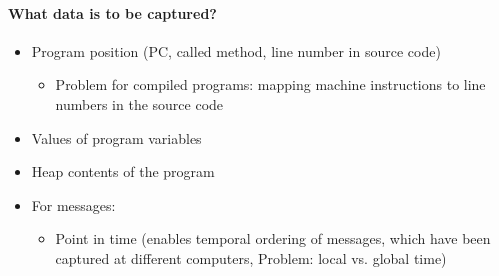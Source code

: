 \documentclass[10pt,a4paper]{article}
\begin{document}
		\paragraph{What data is to be captured?}
		\begin{itemize}
			\item Program position (PC, called method, line number in source
			code)
			\begin{itemize}
				\item Problem for compiled programs: mapping machine instructions to line numbers in the source code
			\end{itemize}
			\item Values of program variables
			\item Heap contents of the program
			\item For messages:
			\begin{itemize}
				\item Point in time (enables temporal ordering of messages, which have been captured at different computers, Problem: local vs. global time)
			\end{itemize}
		\end{itemize}
	
\end{document}

